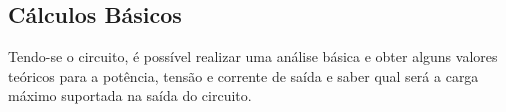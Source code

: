 \documentclass[
	article,			%
	11pt,				%
	oneside,			%
	a4paper,			%
	english,			%
	brazil,				%
	sumario=tradicional
	]{abntex2}
\begin{document}
\begin{comment}
O regulador de tensão, neste projeto, é um CI comercial, foi utilizado os reguladores 7805, 7812 e 7912 para a regulação as tensões de 5VDC, 12VDC e -12VDC respectivamente, e o LM317 para a regulação da tensão ajustável. Estes CI's regulam e estabilizam a tensão, e fornecem em sua saída a tensão especificada pelo fabricante.

Para eliminar possíveis ruídos e fornecer uma melhor estabilização da tensão, com a carga, neste projeto foi utilizado uma última etapa de filtro com capacitor aplicado na saída dos reguladores de tensão, este filtro tem por finalidade assegurar um mínimo de cargas elétricas no fornecimento de corrente com a carga, e eliminar ruídos de alta freqüência, provenientes da operação interna dos reguladores de tensão.
\end{comment}

\subsection{Cálculos Básicos}\label{Calculos}

Tendo-se o circuito, é possível realizar uma análise básica e obter alguns valores teóricos para a potência, tensão e corrente de saída e saber qual será a carga máximo suportada na saída do circuito.
\end{document}

